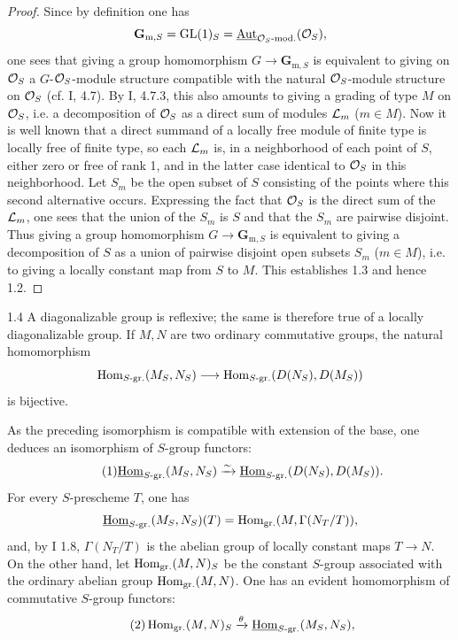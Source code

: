 \begin{proof}
Since by definition one has
\[
\mathbf{G}_{\mathrm{m},S}=\GL(1)_S=\underline{\Aut}_{\OS\text{-}\mathrm{mod.}}(\OS),
\]
one sees that giving a group homomorphism $G\to\mathbf{G}_{\mathrm{m},S}$ is equivalent to giving on $\OS$ a $G$-$\OS$-module structure compatible with the natural $\OS$-module structure on $\OS$ (cf. I, 4.7). By I, 4.7.3, this also amounts to giving a grading of type $M$ on $\OS$, i.e. a decomposition of $\OS$ as a direct sum of modules $\cal L_m$ ($m\in M$). Now it is well known that a direct summand of a locally free module of finite type is locally free of finite type, so each $\cal L_m$ is, in a neighborhood of each point of $S$, either zero or free of rank 1, and in the latter case identical to $\OS$ in this neighborhood. Let $S_m$ be the open subset of $S$ consisting of the points where this second alternative occurs. Expressing the fact that $\OS$ is the direct sum of the $\cal L_m$, one sees that the union of the $S_m$ is $S$ and that the $S_m$ are pairwise disjoint. Thus giving a group homomorphism $G\to\mathbf{G}_{\mathrm{m},S}$ is equivalent to giving a decomposition of $S$ as a union of pairwise disjoint open subsets $S_m$ ($m\in M$), i.e. to giving a locally constant map from $S$ to $M$. This establishes 1.3 and hence 1.2.
\end{proof}
\begin{corollary}{1.4}\label{VIII.1.4}
A diagonalizable group is reflexive; the same is therefore true of a locally diagonalizable group. If $M,N$ are two ordinary commutative groups, the natural homomorphism
\[
\Hom_{S\text{-}\mathrm{gr.}}(M_S,N_S)\to\Hom_{S\text{-}\mathrm{gr.}}(D(N_S),D(M_S))
\]
is bijective.
\end{corollary}
 As the preceding isomorphism is compatible with extension of the base, one deduces an isomorphism of $S$-group functors:
\begin{equation}\tag{1}
\uHom_{S\text{-}\mathrm{gr.}}(M_S,N_S)\isomto\uHom_{S\text{-}\mathrm{gr.}}(D(N_S),D(M_S)).
\end{equation}
For every $S$-prescheme $T$, one has
\[
\uHom_{S\text{-}\mathrm{gr.}}(M_S,N_S)(T)=\Hom_{\mathrm{gr.}}(M,\Gamma(N_T/T)),
\]
and, by I 1.8, $\Gamma(N_T/T)$ is the abelian group of locally constant maps $T\to N$. On the other hand, let $\Hom_{\mathrm{gr.}}(M,N)_S$ be the constant $S$-group associated with the ordinary abelian group $\Hom_{\mathrm{gr.}}(M,N)$. One has an evident homomorphism of commutative $S$-group functors:
\begin{equation}\tag{2}
\Hom_{\mathrm{gr.}}(M,N)_S\xrightarrow{\theta}\uHom_{S\text{-}\mathrm{gr.}}(M_S,N_S),
\end{equation}
